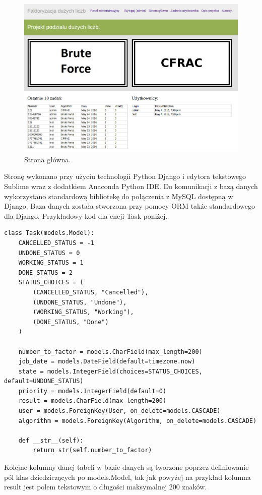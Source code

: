 \documentclass{article}
\begin{document}
\newpage
\begin{figure}[h!]
    \includegraphics[width=\linewidth]{mainpage.png}
    \caption{Strona główna.}
    \label{fig:mainpagescr}
\end{figure}

Stronę wykonano przy użyciu technologii Python Django\cite{django} i edytora tekstowego Sublime\cite{sublime} wraz z dodatkiem Anaconda Python IDE\cite{anacondaide}. Do komunikacji z bazą danych wykorzystano standardową bibliotekę do połączenia z MySQL dostępną w Django. Baza danych została stworzona przy pomocy ORM\cite{orminfo} także standardowego dla Django. Przykładowy kod dla encji Task poniżej.

\begin{lstlisting}
class Task(models.Model):
    CANCELLED_STATUS = -1
    UNDONE_STATUS = 0
    WORKING_STATUS = 1
    DONE_STATUS = 2
    STATUS_CHOICES = (
        (CANCELLED_STATUS, "Cancelled"),
        (UNDONE_STATUS, "Undone"),
        (WORKING_STATUS, "Working"),
        (DONE_STATUS, "Done")
    )

    number_to_factor = models.CharField(max_length=200)
    job_date = models.DateField(default=timezone.now)
    state = models.IntegerField(choices=STATUS_CHOICES, default=UNDONE_STATUS)
    priority = models.IntegerField(default=0)
    result = models.CharField(max_length=200)
    user = models.ForeignKey(User, on_delete=models.CASCADE)
    algorithm = models.ForeignKey(Algorithm, on_delete=models.CASCADE)

    def __str__(self):
        return str(self.number_to_factor)
\end{lstlisting}

Kolejne kolumny danej tabeli w bazie danych są tworzone poprzez definiowanie pól klas dziedziczących po models.Model\cite{djangomodels}, tak jak powyżej na przykład kolumna result jest polem tekstowym o długości maksymalnej 200 znaków. \\
\end{document}
